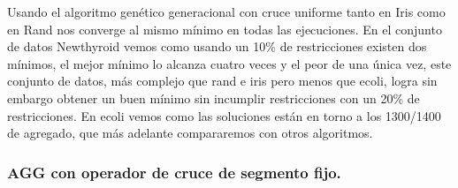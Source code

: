 \documentclass[12pt, spanish]{article}
\begin{document}
\newpage


Usando el algoritmo genético generacional con cruce uniforme tanto en Iris como en Rand nos converge al mismo mínimo en todas las ejecuciones. En el conjunto de datos Newthyroid vemos como usando un 10\% de restricciones existen dos mínimos, el mejor mínimo lo alcanza cuatro veces y el peor de una única vez, este conjunto de datos, más complejo que rand e iris pero menos que ecoli, logra sin embargo obtener un buen mínimo sin incumplir restricciones con un 20\% de restricciones. En ecoli vemos como las soluciones están en torno a los 1300/1400 de agregado, que más adelante compararemos con otros algoritmos.

\subsubsection{AGG con operador de cruce de segmento fijo.}
\end{document}
